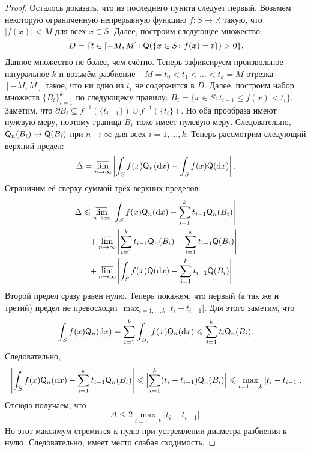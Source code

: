 \begin{proof}
	Осталось доказать, что из последнего пункта следует первый. Возьмём некоторую ограниченную непрерывную функцию $f \colon S \mapsto \mathbb{R}$ такую, что $|f(x)| < M$ для всех $x \in S$. Далее, построим следующее множество:
	\begin{equation}
		D = \{t \in [-M, M] \colon \mathsf{Q}(\{x \in S \colon f(x) = t\}) > 0\}.
	\end{equation}
	Данное множество не более, чем счётно. Теперь зафиксируем произвольное натуральное $k$ и возьмём разбиение $-M = t_{0} < t_{1} < \ldots < t_{k} = M$ отрезка $[-M, M]$ такое, что ни одно из $t_{i}$ не содержится в $D$. Далее, построим набор множеств $\{B_{i}\}_{i = 1}^{k}$ по следующему правилу: $B_{i} = \{x \in S \colon t_{i - 1} \leq f(x) < t_{i}\}$. Заметим, что $\partial B_{i} \subseteq f^{-1}(\{t_{i - 1}\}) \cup f^{-1}(\{t_{i}\})$. Но оба прообраза имеют нулевую меру, поэтому граница $B_{i}$ тоже имеет нулевую меру. Следовательно, $\mathsf{Q}_{n}(B_{i}) \to \mathsf{Q}(B_{i})$ при $n \to \infty$ для всех $i = 1, \ldots, k$. Теперь рассмотрим следующий верхний предел:
	\begin{equation}
		\Delta = \varlimsup_{n \to \infty} \left|\int_{S} f(x)\mathsf{Q}_{n}(\dd x) - \int_{S} f(x)\mathsf{Q}(\dd x)\right|.
	\end{equation}
	Ограничим её сверху суммой трёх верхних пределов:
	\begin{align}
		\Delta 
		&\leqslant \varlimsup_{n \to \infty} \left|\int_{S} f(x)\mathsf{Q}_{n}(\dd x) - \sum_{i = 1}^{k} t_{i - 1}\mathsf{Q}_{n}(B_{i})\right| \\
		&\hphantom{=}+ \varlimsup_{n \to \infty} \left|\sum_{i = 1}^{k} t_{i - 1}\mathsf{Q}_{n}(B_{i}) - \sum_{i = 1}^{k} t_{i - 1}\mathsf{Q}(B_{i})\right| \\
		&\hphantom{=}+ \varlimsup_{n \to \infty} \left|\int_{S} f(x)\mathsf{Q}(\dd x) - \sum_{i = 1}^{k} t_{i - 1}\mathsf{Q}(B_{i})\right|
	\end{align}
	Второй предел сразу равен нулю. Теперь покажем, что первый (а так же и третий) предел не превосходит $\max_{i = 1, \ldots, k}|t_{i} - t_{i - 1}|$. Для этого заметим, что
	\begin{equation}
		\int_{S} f(x)\mathsf{Q}_{n}(\dd x) = \sum_{i = 1}^{k} \int_{B_{i}} f(x)\mathsf{Q}_{n}(\dd x) \leqslant \sum_{i = 1}^{k} t_{i}\mathsf{Q}_{n}(B_{i}).
	\end{equation}
	Следовательно,
	\begin{equation}
		\left|\int_{S} f(x)\mathsf{Q}_{n}(\dd x) - \sum_{i = 1}^{k} t_{i - 1}\mathsf{Q}_{n}(B_{i})\right|
		\leqslant \Bigl|\sum_{i = 1}^{k} (t_{i} - t_{i - 1})\mathsf{Q}_{n}(B_{i})\Bigr|
		\leqslant \max_{i = 1, \ldots, k}|t_{i} - t_{i - 1}|.
	\end{equation}
	Отсюда получаем, что
	\begin{equation}
		\Delta \leq 2\max_{i = 1, \ldots, k}|t_{i} - t_{i - 1}|.
	\end{equation}
	Но этот максимум стремится к нулю при устремлении диаметра разбиения к нулю. Следовательно, имеет место слабая сходимость.
\end{proof}

